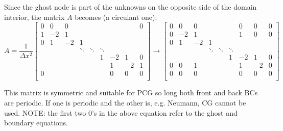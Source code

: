 \documentclass[landscape]{article}
\begin{document}
Since the ghost node is part of the unknowns on the opposite side of the domain interior, the matrix $A$ becomes (a circulant one):
\[ A = \frac{1}{\Delta x^2}
\left[\begin{array}{ccccccccc}
0  & 0     & 0         &           &           &           &           &         &  0 \\
1  & -2    & 1         &           &           &           &           &         &    \\
0  & 1     & -2        & 1         &           &           &           &         &    \\
   &       &           & \ddots    & \ddots    & \ddots    &           &         &    \\
   &       &           &           &           & 1         & -2        & 1       &  0 \\
   &       &           &           &           &           &  1        & -2      &  1 \\
0  &       &           &           &           &           &  0        & 0       &  0 \\
\end{array} \right]
\rightarrow
\left[\begin{array}{ccccccccc}
0  & 0     & 0         &           &           &           &  0        & 0       &  0 \\
0  & -2    & 1         &           &           &           &  1        & 0       &  0 \\
0  & 1     & -2        & 1         &           &           &           &         &    \\
   &       &           & \ddots    & \ddots    & \ddots    &           &         &    \\
   &       &           &           &           & 1         & -2        & 1       &  0 \\
0  & 0     & 1         &           &           &           &  1        & -2      &  0 \\
0  & 0     & 0         &           &           &           &  0        & 0       &  0 \\
\end{array} \right]
\]

This matrix is symmetric and suitable for PCG so long both front and back BCs are periodic. If one is periodic and the other is, e.g. Neumann, CG cannot be used. NOTE: the first two 0's in the above equation refer to the ghost and boundary equations.
\end{document}
